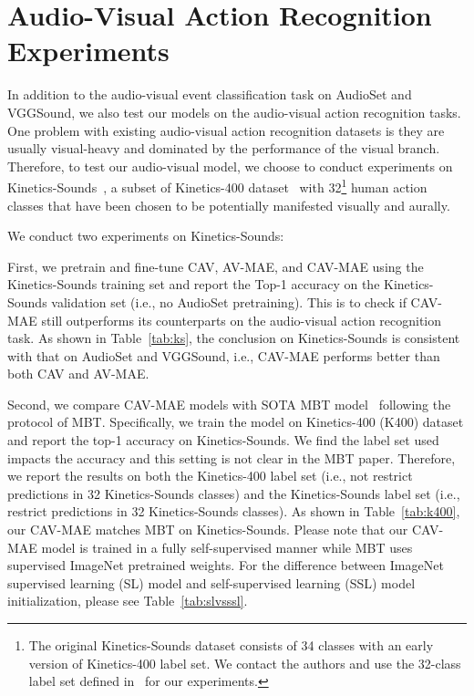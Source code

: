 \documentclass{article} \usepackage{iclr2023_conference,times}
\begin{document}
\section{Audio-Visual Action Recognition Experiments}
\label{sec:ks}

In addition to the audio-visual event classification task on AudioSet and VGGSound, we also test our models on the audio-visual action recognition tasks. One problem with existing audio-visual action recognition datasets is they are usually visual-heavy and dominated by the performance of the visual branch. Therefore, to test our audio-visual model, we choose to conduct experiments on Kinetics-Sounds~\citep{arandjelovic2017look}, a subset of Kinetics-400 dataset~\citep{kay2017kinetics} with 32\footnote{The original Kinetics-Sounds dataset consists of 34 classes with an early version of Kinetics-400 label set. We contact the authors and use the 32-class label set defined in~\citep{xiao2020audiovisual} for our experiments.} human action classes that have been chosen to be potentially manifested visually and aurally.

We conduct two experiments on Kinetics-Sounds:

First, we pretrain and fine-tune CAV, AV-MAE, and CAV-MAE using the Kinetics-Sounds training set and report the Top-1 accuracy on the Kinetics-Sounds validation set (i.e., no AudioSet pretraining). This is to check if CAV-MAE still outperforms its counterparts on the audio-visual action recognition task. As shown in Table~\ref{tab:ks}, the conclusion on Kinetics-Sounds is consistent with that on AudioSet and VGGSound, i.e., CAV-MAE performs better than both CAV and AV-MAE.

Second, we compare CAV-MAE models with SOTA MBT model~\citep{nagrani2021attention} following the protocol of MBT. Specifically, we train the model on Kinetics-400 (K400) dataset and report the top-1 accuracy on Kinetics-Sounds. We find the label set used impacts the accuracy and this setting is not clear in the MBT paper. Therefore, we report the results on both the Kinetics-400 label set (i.e., not restrict predictions in 32 Kinetics-Sounds classes) and the Kinetics-Sounds label set (i.e., restrict predictions in 32 Kinetics-Sounds classes). As shown in Table~\ref{tab:k400}, our CAV-MAE matches MBT on Kinetics-Sounds. Please note that our CAV-MAE model is trained in a fully self-supervised manner while MBT uses supervised ImageNet pretrained weights. For the difference between ImageNet supervised learning (SL) model and self-supervised learning (SSL) model initialization, please see Table~\ref{tab:slvsssl}.
\end{document}
